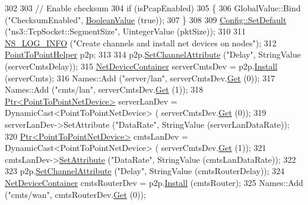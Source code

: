 \begin{DoxyCode}
302 
303   \textcolor{comment}{// Enable checksum}
304   \textcolor{keywordflow}{if} (isPcapEnabled)
305     \{
306       GlobalValue::Bind (\textcolor{stringliteral}{"ChecksumEnabled"}, \hyperlink{classns3_1_1BooleanValue}{BooleanValue} (\textcolor{keyword}{true}));
307     \}
308 
309   \hyperlink{group__config_ga2e7882df849d8ba4aaad31c934c40c06}{Config::SetDefault} (\textcolor{stringliteral}{"ns3::TcpSocket::SegmentSize"}, UintegerValue (pktSize));
310 
311   \hyperlink{group__logging_gafbd73ee2cf9f26b319f49086d8e860fb}{NS\_LOG\_INFO} (\textcolor{stringliteral}{"Create channels and install net devices on nodes"});
312   \hyperlink{classns3_1_1PointToPointHelper}{PointToPointHelper} p2p;
313 
314   p2p.\hyperlink{classns3_1_1PointToPointHelper_a6b5317fd17fb61e5a53f8d66a90b63b9}{SetChannelAttribute} (\textcolor{stringliteral}{"Delay"}, StringValue (serverCmtsDelay));
315   \hyperlink{classns3_1_1NetDeviceContainer}{NetDeviceContainer} serverCmtsDev = p2p.\hyperlink{classns3_1_1PointToPointHelper_ab9162fea3e88722666fed1106df1f9ec}{Install} (serverCmts);
316   Names::Add (\textcolor{stringliteral}{"server/lan"}, serverCmtsDev.\hyperlink{classns3_1_1NetDeviceContainer_a677d62594b5c9d2dea155cc5045f4d0b}{Get} (0));
317   Names::Add (\textcolor{stringliteral}{"cmts/lan"}, serverCmtsDev.\hyperlink{classns3_1_1NetDeviceContainer_a677d62594b5c9d2dea155cc5045f4d0b}{Get} (1));
318   \hyperlink{classns3_1_1Ptr}{Ptr<PointToPointNetDevice>} serverLanDev = DynamicCast<PointToPointNetDevice> (
      serverCmtsDev.\hyperlink{classns3_1_1NetDeviceContainer_a677d62594b5c9d2dea155cc5045f4d0b}{Get} (0));
319   serverLanDev->SetAttribute (\textcolor{stringliteral}{"DataRate"}, StringValue (serverLanDataRate));
320   \hyperlink{classns3_1_1Ptr}{Ptr<PointToPointNetDevice>} cmtsLanDev = DynamicCast<PointToPointNetDevice> (
      serverCmtsDev.\hyperlink{classns3_1_1NetDeviceContainer_a677d62594b5c9d2dea155cc5045f4d0b}{Get} (1));
321   cmtsLanDev->\hyperlink{classns3_1_1ObjectBase_ac60245d3ea4123bbc9b1d391f1f6592f}{SetAttribute} (\textcolor{stringliteral}{"DataRate"}, StringValue (cmtsLanDataRate));
322 
323   p2p.\hyperlink{classns3_1_1PointToPointHelper_a6b5317fd17fb61e5a53f8d66a90b63b9}{SetChannelAttribute} (\textcolor{stringliteral}{"Delay"}, StringValue (cmtsRouterDelay));
324   \hyperlink{classns3_1_1NetDeviceContainer}{NetDeviceContainer} cmtsRouterDev = p2p.\hyperlink{classns3_1_1PointToPointHelper_ab9162fea3e88722666fed1106df1f9ec}{Install} (cmtsRouter);
325   Names::Add (\textcolor{stringliteral}{"cmts/wan"}, cmtsRouterDev.\hyperlink{classns3_1_1NetDeviceContainer_a677d62594b5c9d2dea155cc5045f4d0b}{Get} (0));

\end{DoxyCode}
